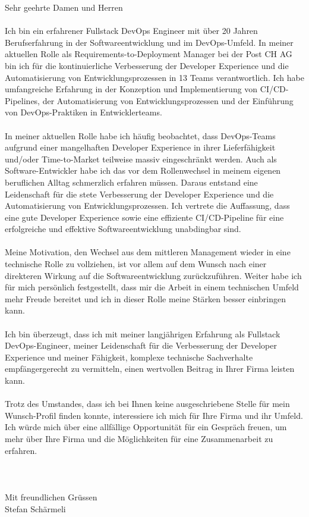 \documentclass[12pt]{developercv} %
\begin{document}
Sehr geehrte Damen und Herren
\\ \\
Ich bin ein erfahrener Fullstack DevOps Engineer mit über 20 Jahren Berufserfahrung in der Softwareentwicklung und im DevOps-Umfeld. In meiner aktuellen Rolle als Requirements-to-Deployment Manager bei der Post CH AG bin ich für die kontinuierliche Verbesserung der Developer Experience und die Automatisierung von Entwicklungsprozessen in 13 Teams verantwortlich. Ich habe umfangreiche Erfahrung in der Konzeption und Implementierung von CI/CD-Pipelines, der Automatisierung von Entwicklungsprozessen und der Einführung von DevOps-Praktiken in Entwicklerteams.
\\ \\
In meiner aktuellen Rolle habe ich häufig beobachtet, dass DevOps-Teams aufgrund einer mangelhaften Developer Experience in ihrer Lieferfähigkeit und/oder Time-to-Market teilweise massiv eingeschränkt werden. Auch als Software-Entwickler habe ich das vor dem Rollenwechsel in meinem eigenen beruflichen Alltag schmerzlich erfahren müssen. Daraus entstand eine Leidenschaft für die stete Verbesserung der Developer Experience und die Automatisierung von Entwicklungsprozessen. Ich vertrete die Auffassung, dass eine gute Developer Experience sowie eine effiziente CI/CD-Pipeline für eine erfolgreiche und effektive Softwareentwicklung unabdingbar sind.
\\ \\
Meine Motivation, den Wechsel aus dem mittleren Management wieder in eine technische Rolle zu vollziehen, ist vor allem auf dem Wunsch nach einer direkteren Wirkung auf die Softwareentwicklung zurückzuführen. Weiter habe ich für mich persönlich festgestellt, dass mir die Arbeit in einem technischen Umfeld mehr Freude bereitet und ich in dieser Rolle meine Stärken besser einbringen kann.
\\ \\
Ich bin überzeugt, dass ich mit meiner langjährigen Erfahrung als Fullstack DevOps-Engineer, meiner Leidenschaft für die Verbesserung der Developer Experience und meiner Fähigkeit, komplexe technische Sachverhalte empfängergerecht zu vermitteln, einen wertvollen Beitrag in Ihrer Firma leisten kann.
\\ \\
Trotz des Umstandes, dass ich bei Ihnen keine ausgeschriebene Stelle für mein Wunsch-Profil finden konnte, interessiere ich mich für Ihre Firma und ihr Umfeld. Ich würde mich über eine allfällige Opportunität für ein Gespräch freuen, um mehr über Ihre Firma und die Möglichkeiten für eine Zusammenarbeit zu erfahren.
\\ \\
\\ \\
Mit freundlichen Grüssen
\\
Stefan Schärmeli
\end{document}
